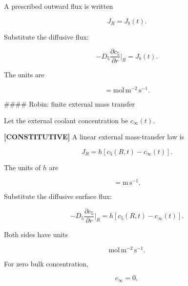 \documentclass[11pt,a4paper]{article}
\begin{document}
A prescribed outward flux is written

\begin{equation}
\boxed{
J_R=J_b(t).
}
\tag{TRISO-BC-114}
\label{eq:triso-bc-114}
\end{equation}

Substitute the diffusive flux:

\begin{equation}
-D_5
\frac{\partial c_5}{\partial r}
\bigg|_R
=
J_b(t).
\tag{TRISO-BC-115}
\label{eq:triso-bc-115}
\end{equation}

The units are

\begin{equation}
[J_b]=\mathrm{mol\,m^{-2}\,s^{-1}}.
\tag{TRISO-BC-116}
\label{eq:triso-bc-116}
\end{equation}

\#\#\#\# Robin: finite external mass transfer

Let the external coolant concentration be $c_\infty(t)$.

\textbf{[CONSTITUTIVE]} A linear external mass-transfer law is

\begin{equation}
J_R
=
h
\left[
c_5(R,t)-c_\infty(t)
\right].
\tag{TRISO-BC-117}
\label{eq:triso-bc-117}
\end{equation}

The units of $h$ are

\begin{equation}
[h]=\mathrm{m\,s^{-1}}.
\tag{TRISO-BC-118}
\label{eq:triso-bc-118}
\end{equation}

Substitute the diffusive surface flux:

\begin{equation}
-D_5
\frac{\partial c_5}{\partial r}
\bigg|_R
=
h
\left[
c_5(R,t)-c_\infty(t)
\right].
\tag{TRISO-BC-119}
\label{eq:triso-bc-119}
\end{equation}

Both sides have units

\begin{equation}
\mathrm{mol\,m^{-2}\,s^{-1}}.
\tag{TRISO-BC-120}
\label{eq:triso-bc-120}
\end{equation}

For zero bulk concentration,

\begin{equation}
c_\infty=0,
\tag{TRISO-BC-121}
\label{eq:triso-bc-121}
\end{equation}
\end{document}
